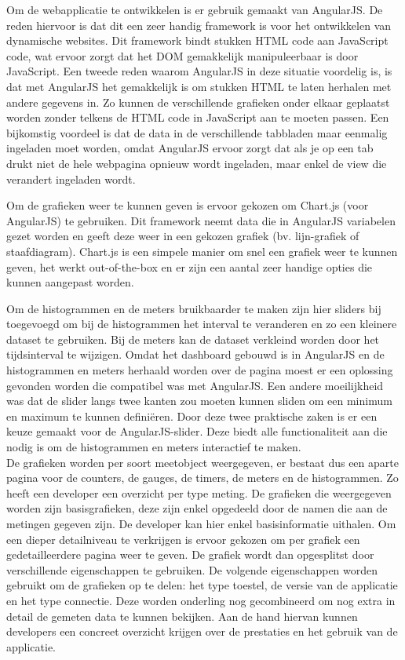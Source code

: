 Om de webapplicatie te ontwikkelen is er gebruik gemaakt van AngularJS. De reden hiervoor is dat dit een zeer handig framework is voor het ontwikkelen van dynamische websites. Dit framework bindt stukken HTML code aan JavaScript code, wat ervoor zorgt dat het DOM gemakkelijk manipuleerbaar is door JavaScript. Een tweede reden waarom AngularJS in deze situatie voordelig is, is dat met AngularJS het gemakkelijk is om stukken HTML te laten herhalen met andere gegevens in. Zo kunnen de verschillende grafieken onder elkaar geplaatst worden zonder telkens de HTML code in JavaScript aan te moeten passen. Een bijkomstig voordeel is dat de data in de verschillende tabbladen maar eenmalig ingeladen moet worden, omdat AngularJS ervoor zorgt dat als je op een tab drukt niet de hele webpagina opnieuw wordt ingeladen, maar enkel de view die verandert ingeladen wordt.

Om de grafieken weer te kunnen geven is ervoor gekozen om Chart.js (voor AngularJS) te gebruiken. Dit framework neemt data die in AngularJS variabelen gezet worden en geeft deze weer in een gekozen grafiek (bv. lijn-grafiek of staafdiagram). Chart.js is een simpele manier om snel een grafiek weer te kunnen geven, het werkt out-of-the-box en er zijn een aantal zeer handige opties die kunnen aangepast worden. 

Om de histogrammen en de meters bruikbaarder te maken zijn hier sliders bij toegevoegd om bij de histogrammen het interval te veranderen en zo een kleinere dataset te gebruiken. Bij de meters kan de dataset verkleind worden door het tijdsinterval te wijzigen. Omdat het dashboard gebouwd is in AngularJS en de histogrammen en meters herhaald worden over de pagina moest er een oplossing gevonden worden die compatibel was met AngularJS. Een andere moeilijkheid was dat de slider langs twee kanten zou moeten kunnen sliden om een minimum en maximum te kunnen defini\"eren. Door deze twee praktische zaken is er een keuze gemaakt voor de AngularJS-slider. Deze biedt alle functionaliteit aan die nodig is om de histogrammen en meters interactief te maken.\\


De grafieken worden per soort meetobject weergegeven, er bestaat dus een aparte pagina voor de counters, de gauges, de timers, de meters en de histogrammen. Zo heeft een developer een overzicht per type meting. De grafieken die weergegeven worden zijn basisgrafieken, deze zijn enkel opgedeeld door de namen die aan de metingen gegeven zijn. De developer kan hier enkel basisinformatie uithalen. Om een dieper detailniveau te verkrijgen is ervoor gekozen om per grafiek een gedetailleerdere pagina weer te geven. De grafiek wordt dan opgesplitst door verschillende eigenschappen te gebruiken. De volgende eigenschappen worden gebruikt om de grafieken op te delen: het type toestel, de versie van de applicatie en het type connectie. Deze worden onderling nog gecombineerd om nog extra in detail de gemeten data te kunnen bekijken. Aan de hand hiervan kunnen developers een concreet overzicht krijgen over de prestaties en het gebruik van de applicatie. \\

